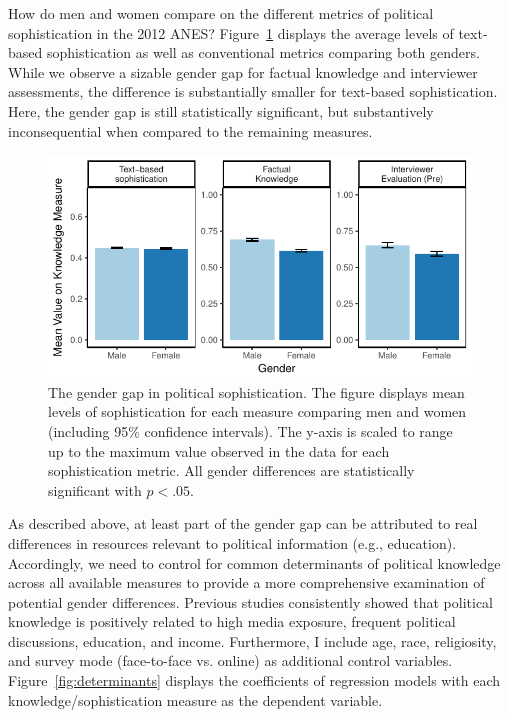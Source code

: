 \documentclass[12pt]{article}
\begin{document}

How do men and women compare on the different metrics of political sophistication in the 2012 ANES? Figure~\ref{fig:meandiff} displays the average levels of text-based sophistication as well as conventional metrics comparing both genders. While we observe a sizable gender gap for factual knowledge and interviewer assessments, the difference is substantially smaller for text-based sophistication. Here, the gender gap is still statistically significant, but substantively inconsequential when compared to the remaining measures.

\begin{figure}[h]\centering
\includegraphics{../fig/meandiff_pres.pdf}
\caption{The gender gap in political sophistication. The figure displays mean levels of sophistication for each measure comparing men and women (including 95\% confidence intervals). The y-axis is scaled to range up to the maximum value observed in the data for each sophistication metric. All gender differences are statistically significant with $p<.05$.}\label{fig:meandiff}
\end{figure}

As described above, at least part of the gender gap can be attributed to real differences in resources relevant to political information (e.g., education). Accordingly, we need to control for common determinants of political knowledge across all available measures to provide a more comprehensive examination of potential gender differences. Previous studies consistently showed that political knowledge is positively related to high media exposure, frequent political discussions, education, and income. Furthermore, I include age, race, religiosity, and survey mode (face-to-face vs. online) as additional control variables. Figure~\ref{fig:determinants} displays the coefficients of regression models with each knowledge/sophistication measure as the dependent variable.
\end{document}
